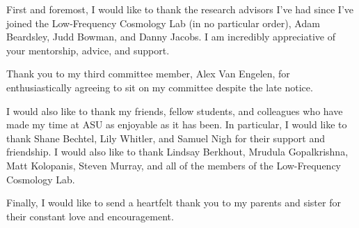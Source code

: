 First and foremost, I would like to thank the research advisors I've had since
I've joined the Low-Frequency Cosmology Lab (in no particular order), Adam Beardsley,
Judd Bowman, and Danny Jacobs. I am incredibly appreciative of your mentorship,
advice, and support.

Thank you to my third committee member, Alex Van Engelen, for enthusiastically
agreeing to sit on my committee despite the late notice.

I would also like to thank my friends, fellow students, and colleagues
who have made my time at ASU as enjoyable as it has been. In particular, I would like to
thank Shane Bechtel, Lily Whitler, and Samuel Nigh for their support and friendship.
I would also like to thank Lindsay Berkhout, Mrudula Gopalkrishna, Matt Kolopanis,
Steven Murray, and all of the members of the Low-Frequency Cosmology Lab.

Finally, I would like to send a heartfelt thank you to my parents and sister
for their constant love and encouragement.

\clearpage
